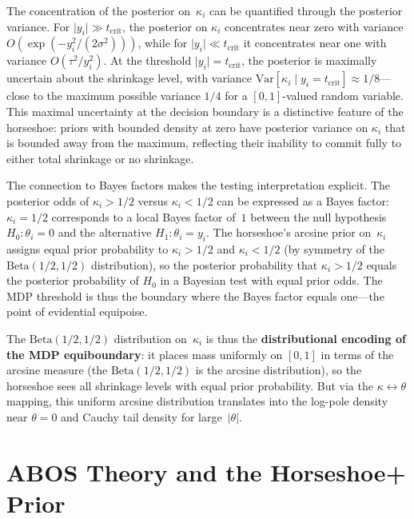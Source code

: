 \documentclass[12pt]{article}
\newcommand{\Var}{\mathrm{Var}}
\newcommand{\abs}[1]{\lvert #1 \rvert}
\newcommand{\tcrit}{t_{\mathrm{crit}}}
\begin{document}
The concentration of the posterior on~$\kappa_i$ can be quantified through the posterior variance. For $\abs{y_i} \gg \tcrit$, the posterior on $\kappa_i$ concentrates near zero with variance $O(\exp(-y_i^2/(2\sigma^2)))$, while for $\abs{y_i} \ll \tcrit$ it concentrates near one with variance $O(\tau^2/y_i^2)$. At the threshold $\abs{y_i} = \tcrit$, the posterior is maximally uncertain about the shrinkage level, with variance $\Var[\kappa_i \mid y_i = \tcrit] \approx 1/8$---close to the maximum possible variance $1/4$ for a $[0,1]$-valued random variable. This maximal uncertainty at the decision boundary is a distinctive feature of the horseshoe: priors with bounded density at zero have posterior variance on $\kappa_i$ that is bounded away from the maximum, reflecting their inability to commit fully to either total shrinkage or no shrinkage.

The connection to Bayes factors makes the testing interpretation explicit. The posterior odds of $\kappa_i > 1/2$ versus $\kappa_i < 1/2$ can be expressed as a Bayes factor: $\kappa_i = 1/2$ corresponds to a local Bayes factor of~$1$ between the null hypothesis $H_0: \theta_i = 0$ and the alternative $H_1: \theta_i = y_i$. The horseshoe's arcsine prior on~$\kappa_i$ assigns equal prior probability to $\kappa_i > 1/2$ and $\kappa_i < 1/2$ (by symmetry of the $\mathrm{Beta}(1/2,1/2)$ distribution), so the posterior probability that $\kappa_i > 1/2$ equals the posterior probability of $H_0$ in a Bayesian test with equal prior odds. The MDP threshold is thus the boundary where the Bayes factor equals one---the point of evidential equipoise.

The $\mathrm{Beta}(1/2, 1/2)$ distribution on~$\kappa_i$ is thus the \textbf{distributional encoding of the MDP equiboundary}: it places mass uniformly on $[0,1]$ in terms of the arcsine measure (the $\mathrm{Beta}(1/2, 1/2)$ is the arcsine distribution), so the horseshoe sees all shrinkage levels with equal prior probability. But via the $\kappa \leftrightarrow \theta$ mapping, this uniform arcsine distribution translates into the log-pole density near $\theta = 0$ and Cauchy tail density for large~$\abs{\theta}$.


\section{ABOS Theory and the Horseshoe+ Prior}\label{sec:abos}
\end{document}
